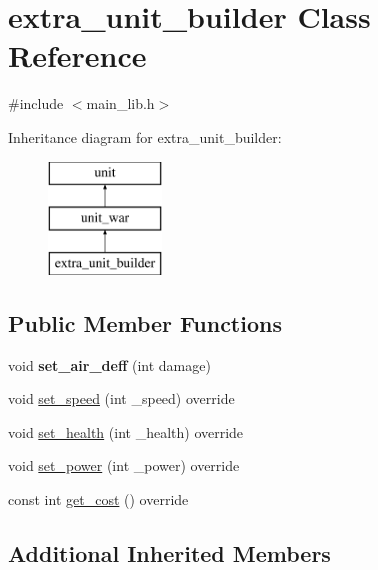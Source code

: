 \hypertarget{classextra__unit__builder}{}\section{extra\+\_\+unit\+\_\+builder Class Reference}
\label{classextra__unit__builder}


{\ttfamily \#include $<$main\+\_\+lib.\+h$>$}

Inheritance diagram for extra\+\_\+unit\+\_\+builder\+:\begin{figure}[H]
\begin{center}
\leavevmode
\includegraphics[height=3.000000cm]{classextra__unit__builder}
\end{center}
\end{figure}
\subsection*{Public Member Functions}
\begin{DoxyCompactItemize}
\item 
\mbox{\label{classextra__unit__builder_a881bf623a6795bd39fc1e490f74fc794}} 
void {\bfseries set\+\_\+air\+\_\+deff} (int damage)
\item 
void \mbox{\hyperlink{classextra__unit__builder_aa95d6dcfba85a06592d6725baebd51cc}{set\+\_\+speed}} (int \+\_\+speed) override
\item 
void \mbox{\hyperlink{classextra__unit__builder_a7471f05c65d3f2c230c405ec0bcdaa7d}{set\+\_\+health}} (int \+\_\+health) override
\item 
void \mbox{\hyperlink{classextra__unit__builder_a98602fd267039102bd6b431bdf5b658d}{set\+\_\+power}} (int \+\_\+power) override
\item 
const int \mbox{\hyperlink{classextra__unit__builder_a84ce334361c5acd1a59775a74fabde86}{get\+\_\+cost}} () override
\end{DoxyCompactItemize}
\subsection*{Additional Inherited Members}


